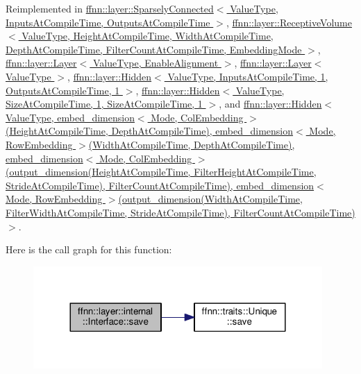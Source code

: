 Reimplemented in \hyperlink{classffnn_1_1layer_1_1_sparsely_connected_aa8ae358e7cf06b58f3d33be2851d0260}{ffnn\-::layer\-::\-Sparsely\-Connected$<$ Value\-Type, Inputs\-At\-Compile\-Time, Outputs\-At\-Compile\-Time $>$}, \hyperlink{classffnn_1_1layer_1_1_receptive_volume_a9f813e0c5c60d572a296b8ec1fc25086}{ffnn\-::layer\-::\-Receptive\-Volume$<$ Value\-Type, Height\-At\-Compile\-Time, Width\-At\-Compile\-Time, Depth\-At\-Compile\-Time, Filter\-Count\-At\-Compile\-Time, Embedding\-Mode $>$}, \hyperlink{classffnn_1_1layer_1_1_layer_a5091f6ccef4d80254dd8caf72d13d136}{ffnn\-::layer\-::\-Layer$<$ Value\-Type, Enable\-Alignment $>$}, \hyperlink{classffnn_1_1layer_1_1_layer_a5091f6ccef4d80254dd8caf72d13d136}{ffnn\-::layer\-::\-Layer$<$ Value\-Type $>$}, \hyperlink{classffnn_1_1layer_1_1_hidden_a98305185267a0f7953f1b53c4bce4cf6}{ffnn\-::layer\-::\-Hidden$<$ Value\-Type, Inputs\-At\-Compile\-Time, 1, Outputs\-At\-Compile\-Time, 1 $>$}, \hyperlink{classffnn_1_1layer_1_1_hidden_a98305185267a0f7953f1b53c4bce4cf6}{ffnn\-::layer\-::\-Hidden$<$ Value\-Type, Size\-At\-Compile\-Time, 1, Size\-At\-Compile\-Time, 1 $>$}, and \hyperlink{classffnn_1_1layer_1_1_hidden_a98305185267a0f7953f1b53c4bce4cf6}{ffnn\-::layer\-::\-Hidden$<$ Value\-Type, embed\-\_\-dimension$<$ Mode, Col\-Embedding $>$(\-Height\-At\-Compile\-Time, Depth\-At\-Compile\-Time), embed\-\_\-dimension$<$ Mode, Row\-Embedding $>$(\-Width\-At\-Compile\-Time, Depth\-At\-Compile\-Time), embed\-\_\-dimension$<$ Mode, Col\-Embedding $>$(output\-\_\-dimension(\-Height\-At\-Compile\-Time, Filter\-Height\-At\-Compile\-Time, Stride\-At\-Compile\-Time), Filter\-Count\-At\-Compile\-Time), embed\-\_\-dimension$<$ Mode, Row\-Embedding $>$(output\-\_\-dimension(\-Width\-At\-Compile\-Time, Filter\-Width\-At\-Compile\-Time, Stride\-At\-Compile\-Time), Filter\-Count\-At\-Compile\-Time)$>$}.



Here is the call graph for this function\-:\nopagebreak
\begin{figure}[H]
\begin{center}
\leavevmode
\includegraphics[width=312pt]{classffnn_1_1layer_1_1internal_1_1_interface_a417d6fda112fdffed8091b0ebd78ed97_cgraph}
\end{center}
\end{figure}



